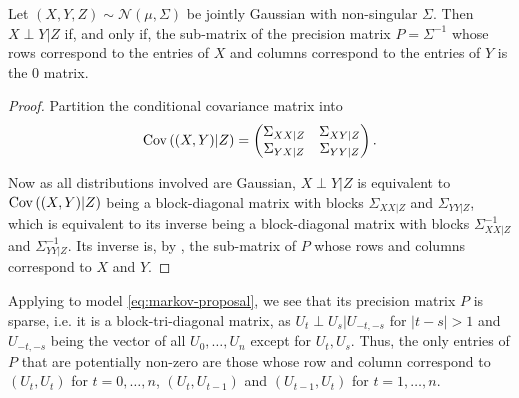 \begin{lemma}
    \label{lem:gaussian_precision_zeros}
    Let $(X,Y,Z) \sim \mathcal N \left( \mu, \Sigma \right)$ be jointly Gaussian with non-singular $\Sigma$. Then $X \perp Y | Z$ if, and only if, the sub-matrix of the precision matrix $P = \Sigma^{-1}$ whose rows correspond to the entries of $X$ and columns correspond to the entries of $Y$ is the $0$ matrix.
\end{lemma}
\begin{proof}
    Partition the conditional covariance matrix into
    $$
    \operatorname{Cov} \left((X,Y) | Z\right) = \begin{pmatrix}
        \Sigma_{XX|Z} & \Sigma_{XY|Z} \\
        \Sigma_{YX|Z} & \Sigma_{YY|Z}
    \end{pmatrix}.
    $$

    Now as all distributions involved are Gaussian, $X \perp Y | Z$ is equivalent to $\operatorname{Cov} \left( (X,Y) |Z \right)$ being a block-diagonal matrix with blocks $\Sigma_{XX|Z}$ and $\Sigma_{YY|Z}$, which is equivalent to its inverse being a block-diagonal matrix with blocks $\Sigma_{XX|Z}^{-1}$ and $\Sigma_{YY|Z}^{-1}$. Its inverse is, by , the sub-matrix of $P$ whose rows and columns correspond to $X$ and $Y$. 
\end{proof}

Applying  to model \eqref{eq:markov-proposal}, we see that its precision matrix $P$ is sparse, i.e. it is a block-tri-diagonal matrix, as $U_{t} \perp U_{s} | U_{-t,-s}$ for $\lvert t - s\rvert > 1$ and $U_{-t,-s}$ being the vector of all $U_{0}, \dots, U_{n}$ except for $U_{t}, U_{s}$. Thus, the only entries of $P$ that are potentially non-zero are those whose row and column correspond to $(U_{t}, U_{t})$ for $t = 0, \dots, n$, $(U_{t}, U_{t - 1})$ and $(U_{t - 1}, U_{t})$ for $t=1, \dots, n$. 

